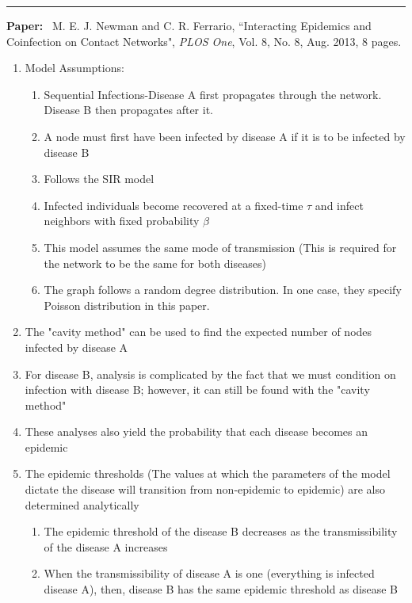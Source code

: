 \documentclass[11pt]{article}
\begin{document}
\smallskip
\noindent
\rule{\textwidth}{0.01in}

\clearpage

\noindent
\textbf{Paper:}~ 
M. E. J. Newman and C. R. Ferrario, ``Interacting Epidemics and
Coinfection on Contact Networks", \emph{PLOS One}, Vol. 8, No. 8, Aug. 2013,
8 pages.

\begin{enumerate}
    \item Model Assumptions:
    \begin{enumerate}
        \item Sequential Infections-Disease A first propagates through the network. Disease B then propagates after it.
        \item A node must first have been infected by disease A if it is to be infected by disease B
        \item Follows the SIR model
        \item Infected individuals become recovered at a fixed-time $\tau$ and infect neighbors with fixed probability $\beta$
        \item This model assumes the same mode of transmission (This is required for the network to be the same for both diseases)
        \item The graph follows a random degree distribution. In one case, they specify Poisson distribution in this paper.
    \end{enumerate}
    \item The "cavity method" can be used to find the expected number of nodes infected by disease A
    \item For disease B, analysis is complicated by the fact that we must condition on infection with disease B; however, it can still be found with the "cavity method"
    \item These analyses also yield the probability that each disease becomes an epidemic
    \item The epidemic thresholds (The values at which the parameters of the model dictate the disease will transition from non-epidemic to epidemic) are also determined analytically
    \begin{enumerate}
        
        \item The epidemic threshold of the disease B decreases as the transmissibility of the disease A increases
        
        \item When the transmissibility of disease A is one (everything is infected disease A), then, disease B has the same epidemic threshold as disease B
        

\end{enumerate}
\end{enumerate}
\end{document}
